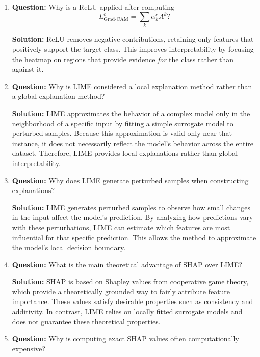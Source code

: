 \documentclass{article}
\begin{document}
\begin{enumerate}
\textbf{Solution:}
It measures how strongly feature map $k$ influences the target class score
$y^c$ on average across spatial locations.  
These weights determine how much each feature map contributes to the final
class activation map.

\item \textbf{Question:}
Why is a ReLU applied after computing
\[
L_{\text{Grad-CAM}}^c = \sum_k \alpha_k^c A^k ?
\]

\textbf{Solution:}
ReLU removes negative contributions, retaining only features that positively
support the target class.  
This improves interpretability by focusing the heatmap on regions that provide
evidence \emph{for} the class rather than against it.

\item \textbf{Question:}
Why is LIME considered a local explanation method rather than a global explanation method?

\textbf{Solution:}
LIME approximates the behavior of a complex model only in the neighborhood of a specific input by fitting a simple surrogate model to perturbed samples. Because this approximation is valid only near that instance, it does not necessarily reflect the model’s behavior across the entire dataset. Therefore, LIME provides local explanations rather than global interpretability.

\item \textbf{Question:}
Why does LIME generate perturbed samples when constructing explanations?

\textbf{Solution:}
LIME generates perturbed samples to observe how small changes in the input affect the model’s prediction. By analyzing how predictions vary with these perturbations, LIME can estimate which features are most influential for that specific prediction. This allows the method to approximate the model’s local decision boundary.

\item \textbf{Question:}
What is the main theoretical advantage of SHAP over LIME?

\textbf{Solution:}
SHAP is based on Shapley values from cooperative game theory, which provide a theoretically grounded way to fairly attribute feature importance. These values satisfy desirable properties such as consistency and additivity. In contrast, LIME relies on locally fitted surrogate models and does not guarantee these theoretical properties.

\item \textbf{Question:}
Why is computing exact SHAP values often computationally expensive?


\end{enumerate}
\end{document}
